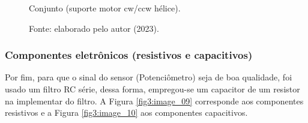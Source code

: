 \begin{figure}[!h]
	\centering
	\caption{Conjunto (suporte motor cw/ccw hélice).}
	\caption*{Fonte: elaborado pelo autor (2023).}
	\label{fig3:image_08}
\end{figure}

\newpage
\subsubsection{Componentes eletrônicos (resistivos e capacitivos)}

Por fim, para que o sinal do sensor (Potenciômetro) seja de boa qualidade, foi usado um filtro RC série, dessa forma, empregou-se um capacitor de um resistor na implementar do filtro. A Figura \ref{fig3:image_09} corresponde aos componentes resistivos e a Figura \ref{fig3:image_10} aos componentes capacitivos.

